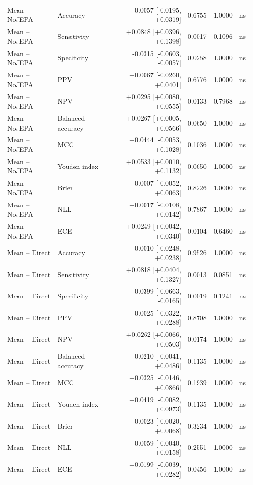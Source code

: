 \begin{table}[t]
\begin{tabular}{llrrrc}
Mean -- NoJEPA & Accuracy & +0.0057 [-0.0195, +0.0319] & 0.6755 & 1.0000 & ns \\
Mean -- NoJEPA & Sensitivity & +0.0848 [+0.0396, +0.1398] & 0.0017 & 0.1096 & ns \\
Mean -- NoJEPA & Specificity & -0.0315 [-0.0603, -0.0057] & 0.0258 & 1.0000 & ns \\
Mean -- NoJEPA & PPV & +0.0067 [-0.0260, +0.0401] & 0.6776 & 1.0000 & ns \\
Mean -- NoJEPA & NPV & +0.0295 [+0.0080, +0.0555] & 0.0133 & 0.7968 & ns \\
Mean -- NoJEPA & Balanced accuracy & +0.0267 [+0.0005, +0.0566] & 0.0650 & 1.0000 & ns \\
Mean -- NoJEPA & MCC & +0.0444 [-0.0053, +0.1028] & 0.1036 & 1.0000 & ns \\
Mean -- NoJEPA & Youden index & +0.0533 [+0.0010, +0.1132] & 0.0650 & 1.0000 & ns \\
Mean -- NoJEPA & Brier & +0.0007 [-0.0052, +0.0063] & 0.8226 & 1.0000 & ns \\
Mean -- NoJEPA & NLL & +0.0017 [-0.0108, +0.0142] & 0.7867 & 1.0000 & ns \\
Mean -- NoJEPA & ECE & +0.0249 [+0.0042, +0.0340] & 0.0104 & 0.6460 & ns \\
Mean -- Direct & Accuracy & -0.0010 [-0.0248, +0.0238] & 0.9526 & 1.0000 & ns \\
Mean -- Direct & Sensitivity & +0.0818 [+0.0404, +0.1327] & 0.0013 & 0.0851 & ns \\
Mean -- Direct & Specificity & -0.0399 [-0.0663, -0.0165] & 0.0019 & 0.1241 & ns \\
Mean -- Direct & PPV & -0.0025 [-0.0322, +0.0288] & 0.8708 & 1.0000 & ns \\
Mean -- Direct & NPV & +0.0262 [+0.0066, +0.0503] & 0.0174 & 1.0000 & ns \\
Mean -- Direct & Balanced accuracy & +0.0210 [-0.0041, +0.0486] & 0.1135 & 1.0000 & ns \\
Mean -- Direct & MCC & +0.0325 [-0.0146, +0.0866] & 0.1939 & 1.0000 & ns \\
Mean -- Direct & Youden index & +0.0419 [-0.0082, +0.0973] & 0.1135 & 1.0000 & ns \\
Mean -- Direct & Brier & +0.0023 [-0.0020, +0.0068] & 0.3234 & 1.0000 & ns \\
Mean -- Direct & NLL & +0.0059 [-0.0040, +0.0158] & 0.2551 & 1.0000 & ns \\
Mean -- Direct & ECE & +0.0199 [-0.0039, +0.0282] & 0.0456 & 1.0000 & ns \\
\bottomrule
\end{tabular}
\end{table}
